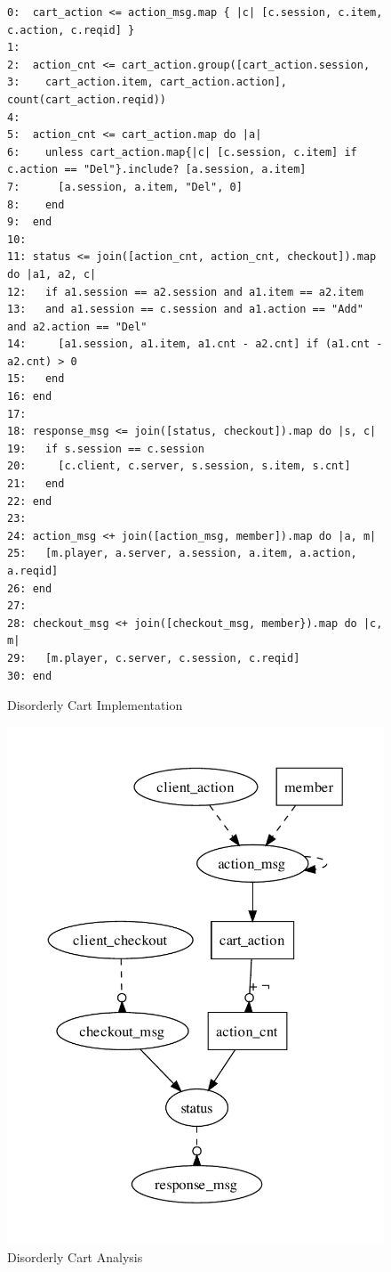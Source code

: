 \begin{figure}[t]
\begin{scriptsize}
\begin{verbatim}
0:  cart_action <= action_msg.map { |c| [c.session, c.item, c.action, c.reqid] }
1:
2:  action_cnt <= cart_action.group([cart_action.session, 
3:    cart_action.item, cart_action.action], count(cart_action.reqid))
4:
5:  action_cnt <= cart_action.map do |a| 
6:    unless cart_action.map{|c| [c.session, c.item] if c.action == "Del"}.include? [a.session, a.item] 
7:      [a.session, a.item, "Del", 0]
8:    end 
9:  end
10: 
11: status <= join([action_cnt, action_cnt, checkout]).map do |a1, a2, c| 
12:   if a1.session == a2.session and a1.item == a2.item 
13:   and a1.session == c.session and a1.action == "Add" and a2.action == "Del"
14:     [a1.session, a1.item, a1.cnt - a2.cnt] if (a1.cnt - a2.cnt) > 0
15:   end
16: end
17:
18: response_msg <= join([status, checkout]).map do |s, c| 
19:   if s.session == c.session
20:     [c.client, c.server, s.session, s.item, s.cnt]
21:   end
22: end
23: 
24: action_msg <+ join([action_msg, member]).map do |a, m|
25:   [m.player, a.server, a.session, a.item, a.action, a.reqid]
26: end
27: 
28: checkout_msg <+ join([checkout_msg, member}).map do |c, m|
29:   [m.player, c.server, c.session, c.reqid]
30: end
\end{verbatim}
\end{scriptsize}
\caption{Disorderly Cart Implementation}
\label{tab:pdg-disorderly}
\end{figure}

\begin{figure}[t]
\centering
\includegraphics[width=0.7\linewidth]{fig/disorderly.pdf}
\caption{Disorderly Cart Analysis}
\label{fig:pdg-disorderly-analysis}
\end{figure}


